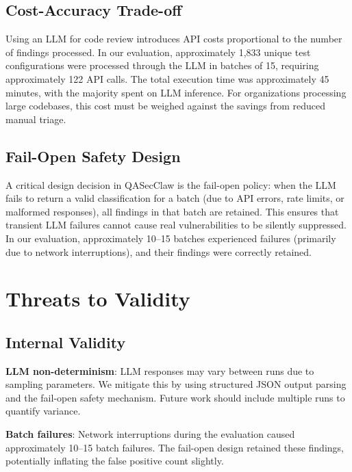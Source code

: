 \documentclass[conference]{IEEEtran}
\begin{document}
\subsection{Cost-Accuracy Trade-off}
Using an LLM for code review introduces API costs proportional to the number of findings processed. In our evaluation, approximately 1,833 unique test configurations were processed through the LLM in batches of 15, requiring approximately 122 API calls. The total execution time was approximately 45 minutes, with the majority spent on LLM inference. For organizations processing large codebases, this cost must be weighed against the savings from reduced manual triage.

\subsection{Fail-Open Safety Design}
A critical design decision in QASecClaw is the fail-open policy: when the LLM fails to return a valid classification for a batch (due to API errors, rate limits, or malformed responses), all findings in that batch are retained. This ensures that transient LLM failures cannot cause real vulnerabilities to be silently suppressed. In our evaluation, approximately 10--15 batches experienced failures (primarily due to network interruptions), and their findings were correctly retained.

\section{Threats to Validity}
\label{sec:threats}

\subsection{Internal Validity}
\textbf{LLM non-determinism}: LLM responses may vary between runs due to sampling parameters. We mitigate this by using structured JSON output parsing and the fail-open safety mechanism. Future work should include multiple runs to quantify variance.

\textbf{Batch failures}: Network interruptions during the evaluation caused approximately 10--15 batch failures. The fail-open design retained these findings, potentially inflating the false positive count slightly.
\end{document}
